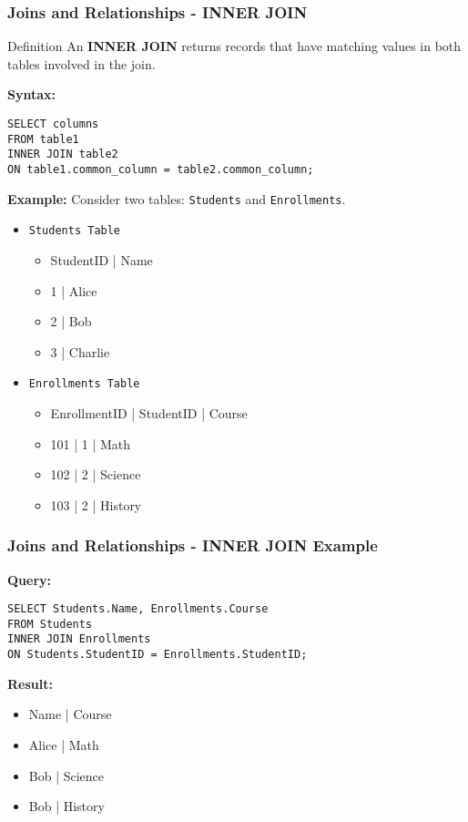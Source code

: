 \documentclass[aspectratio=169]{beamer}
\begin{document}
\begin{frame}[fragile]
    \frametitle{Joins and Relationships - INNER JOIN}
    \begin{block}{Definition}
        An \textbf{INNER JOIN} returns records that have matching values in both tables involved in the join.
    \end{block}
    \textbf{Syntax:}
    \begin{lstlisting}
SELECT columns
FROM table1
INNER JOIN table2
ON table1.common_column = table2.common_column;
    \end{lstlisting}

    \textbf{Example:} Consider two tables: \texttt{Students} and \texttt{Enrollments}.
    \begin{itemize}
        \item \texttt{Students Table}
        \begin{itemize}
            \item StudentID | Name
            \item 1 | Alice
            \item 2 | Bob
            \item 3 | Charlie
        \end{itemize}

        \item \texttt{Enrollments Table}
        \begin{itemize}
            \item EnrollmentID | StudentID | Course
            \item 101 | 1 | Math
            \item 102 | 2 | Science
            \item 103 | 2 | History
        \end{itemize}
    \end{itemize}
\end{frame}

\begin{frame}[fragile]
    \frametitle{Joins and Relationships - INNER JOIN Example}
    \textbf{Query:}
    \begin{lstlisting}
SELECT Students.Name, Enrollments.Course
FROM Students
INNER JOIN Enrollments
ON Students.StudentID = Enrollments.StudentID;
    \end{lstlisting}

    \textbf{Result:}
    \begin{itemize}
        \item Name | Course
        \item Alice | Math
        \item Bob | Science
        \item Bob | History
    \end{itemize}
\end{frame}
\end{document}
